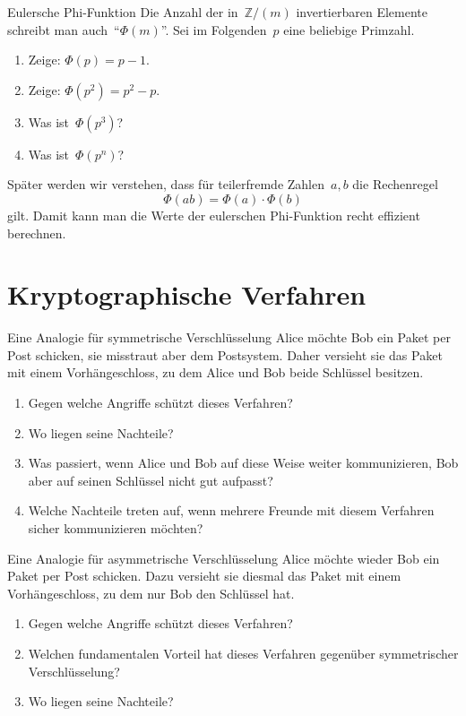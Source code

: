 \documentclass{zirkelblatt}
\newcommand{\head}[1]{\section*{\rmfamily #1}}%
\newcommand{\ZZ}{\mathbb{Z}}
\begin{document}
\newpage
\begin{aufgabe}{Eulersche Phi-Funktion}
Die Anzahl der in~$\ZZ/(m)$ invertierbaren Elemente schreibt man
auch~"`$\Phi(m)$"'. Sei im Folgenden~$p$ eine beliebige Primzahl.
\begin{enumerate}
\item Zeige: $\Phi(p) = p - 1$.
\item Zeige: $\Phi(p^2) = p^2 - p$.
\item Was ist~$\Phi(p^3)$?
\item Was ist~$\Phi(p^n)$?
\end{enumerate}
Später werden wir verstehen, dass für teilerfremde Zahlen~$a,b$ die Rechenregel
\[ \Phi(ab) = \Phi(a) \cdot \Phi(b) \]
gilt. Damit kann man die Werte der eulerschen Phi-Funktion recht effizient
berechnen.
\end{aufgabe}


\head{Kryptographische Verfahren}

\begin{aufgabe}{Eine Analogie für symmetrische Verschlüsselung}
Alice möchte Bob ein Paket per Post schicken, sie misstraut aber dem
Postsystem. Daher versieht sie das Paket mit einem Vorhängeschloss, zu dem
Alice und Bob beide Schlüssel besitzen.
\begin{enumerate}
\item Gegen welche Angriffe schützt dieses Verfahren?
\item Wo liegen seine Nachteile?
\item Was passiert, wenn Alice und Bob auf diese Weise weiter kommunizieren,
Bob aber auf seinen Schlüssel nicht gut aufpasst?
\item Welche Nachteile treten auf, wenn mehrere Freunde mit diesem Verfahren
sicher kommunizieren möchten?
\end{enumerate}
\end{aufgabe}

\begin{aufgabe}{Eine Analogie für asymmetrische Verschlüsselung}
Alice möchte wieder Bob ein Paket per Post schicken. Dazu versieht sie diesmal
das Paket mit einem Vorhängeschloss, zu dem nur Bob den Schlüssel hat.
\begin{enumerate}
\item Gegen welche Angriffe schützt dieses Verfahren?
\item Welchen fundamentalen Vorteil hat dieses Verfahren gegenüber symmetrischer
Verschlüsselung?
\item Wo liegen seine Nachteile?
\end{enumerate}
\end{aufgabe}
\end{document}

